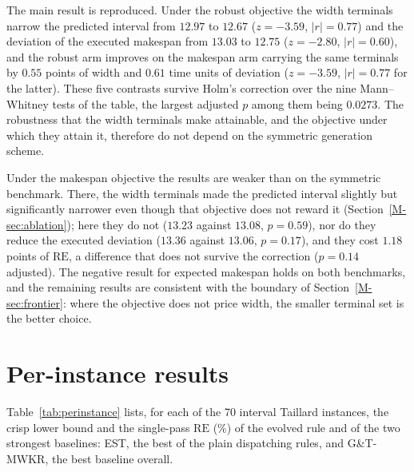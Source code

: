 \documentclass[11pt]{article}
\newcommand{\RE}{\mathrm{RE}}
\begin{document}
The main result is reproduced. Under the robust objective the
width terminals narrow the predicted interval from $12.97$ to $12.67$
($z=-3.59$, $|r|=0.77$) and the deviation of the executed makespan from $13.03$ to
$12.75$ ($z=-2.80$, $|r|=0.60$), and the robust arm improves on the
makespan arm carrying the same terminals by $0.55$ points of width and
$0.61$ time units of deviation ($z=-3.59$, $|r|=0.77$ for the
latter). These five contrasts survive Holm's correction over the nine
Mann--Whitney tests of the table, the largest adjusted $p$ among them
being $0.0273$. The robustness that the width terminals make
attainable, and the objective under which they attain it, therefore do
not depend on the symmetric generation scheme.

Under the makespan objective the results are weaker than on the symmetric benchmark. There, the width terminals made the predicted
interval slightly but significantly narrower even though that objective
does not reward it (Section~\ref{M-sec:ablation}); here they do not
($13.23$ against $13.08$, $p=0.59$), nor do they reduce the executed
deviation ($13.36$ against $13.06$, $p=0.17$), and they cost $1.18$
points of $\RE$, a difference that does not survive the correction
($p=0.14$ adjusted). The negative result for expected makespan holds on
both benchmarks, and the remaining results are consistent with the boundary of
Section~\ref{M-sec:frontier}: where the objective does not price width,
the smaller terminal set is the better choice.

\section{Per-instance results}
\label{sec:perinstance}
Table~\ref{tab:perinstance} lists, for each of the 70 interval Taillard
instances, the crisp lower bound and the single-pass $\RE$ (\%) of the
evolved rule and of the two strongest baselines: EST, the best of the
plain dispatching rules, and G\&T-MWKR, the best baseline overall.
\end{document}

